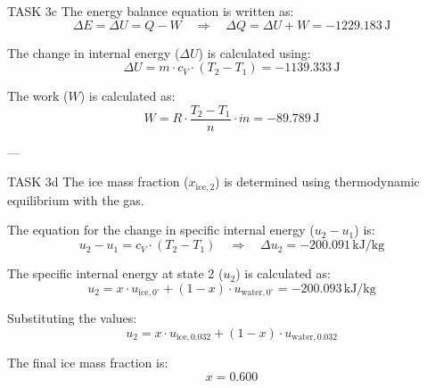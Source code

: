 TASK 3c  
The energy balance equation is written as:  
\[
\Delta E = \Delta U = Q - W \quad \Rightarrow \quad \Delta Q = \Delta U + W = -1229.183 \, \text{J}
\]  

The change in internal energy (\( \Delta U \)) is calculated using:  
\[
\Delta U = m \cdot c_V \cdot (T_2 - T_1) = -1139.333 \, \text{J}
\]  

The work (\( W \)) is calculated as:  
\[
W = R \cdot \frac{T_2 - T_1}{n} \cdot \dot{m} = -89.789 \, \text{J}
\]  

---

TASK 3d  
The ice mass fraction (\( x_{\text{ice},2} \)) is determined using thermodynamic equilibrium with the gas.  

The equation for the change in specific internal energy (\( u_2 - u_1 \)) is:  
\[
u_2 - u_1 = c_V \cdot (T_2 - T_1) \quad \Rightarrow \quad \Delta u_2 = -200.091 \, \text{kJ/kg}
\]  

The specific internal energy at state 2 (\( u_2 \)) is calculated as:  
\[
u_2 = x \cdot u_{\text{ice},0^\circ} + (1 - x) \cdot u_{\text{water},0^\circ} = -200.093 \, \text{kJ/kg}
\]  

Substituting the values:  
\[
u_2 = x \cdot u_{\text{ice},0.032} + (1 - x) \cdot u_{\text{water},0.032}
\]  

The final ice mass fraction is:  
\[
x = 0.600
\]